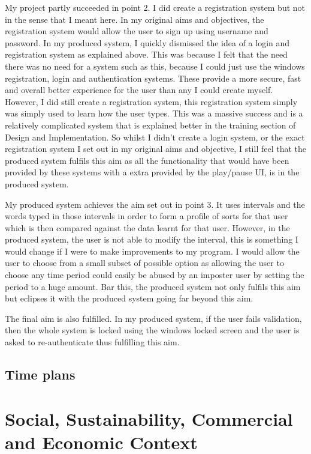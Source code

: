 \documentclass[10pt,a4paper]{report}
\begin{document}
My project partly succeeded in point 2. I did create a registration system but not in the sense that I meant here. In my original aims and objectives, the registration system would allow the user to sign up using username and password. In my produced system, I quickly dismissed the idea of a login and registration system as explained above. This was because I felt that the need there was no need for a system such as this, because I could just use the windows registration, login and authentication systems. These provide a more secure, fast and overall better experience for the user than any I could create myself. However, I did still create a registration system, this registration system simply was simply used to learn how the user types. This was a massive success and is a relatively complicated system that is explained better in the training section of Design and Implementation. So whilst I didn't create a login system, or the exact registration system I set out in my original aims and objective, I still feel that the produced system fulfils this aim as all the functionality that would have been provided by these systems with a extra provided by the play/pause UI, is in the produced system.

My produced system achieves the aim set out in point 3. It uses intervals and the words typed in those intervals in order to form a profile of sorts for that user which is then compared against the data learnt for that user. However, in the produced system, the user is not able to modify the interval, this is something I would change if I were to make improvements to my program. I would allow the user to choose from a small subset of possible option as allowing the user to choose any time period could easily be abused by an imposter user by setting the period to a huge amount. Bar this, the produced system not only fulfils this aim but eclipses it with the produced system going far beyond this aim.

The final aim is also fulfilled. In my produced system, if the user fails validation, then the whole system is locked using the windows locked screen and the user is asked to re-authenticate thus fulfilling this aim.


\subsection{Time plans}

\section{Social, Sustainability, Commercial and Economic Context}
\end{document}
